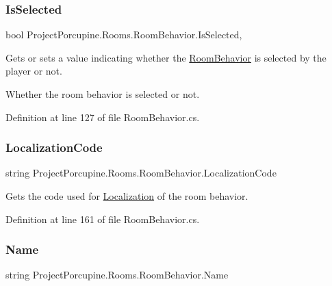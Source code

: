 \subsubsection{\texorpdfstring{Is\+Selected}{IsSelected}}
{\footnotesize\ttfamily bool Project\+Porcupine.\+Rooms.\+Room\+Behavior.\+Is\+Selected\hspace{0.3cm}{\ttfamily [get]}, {\ttfamily [set]}}



Gets or sets a value indicating whether the \hyperlink{class_project_porcupine_1_1_rooms_1_1_room_behavior}{Room\+Behavior} is selected by the player or not. 

Whether the room behavior is selected or not.

Definition at line 127 of file Room\+Behavior.\+cs.

\mbox{\label{class_project_porcupine_1_1_rooms_1_1_room_behavior_aa7bf0c23e20fde63d0ed6018c8a11884}} 
\subsubsection{\texorpdfstring{Localization\+Code}{LocalizationCode}}
{\footnotesize\ttfamily string Project\+Porcupine.\+Rooms.\+Room\+Behavior.\+Localization\+Code\hspace{0.3cm}{\ttfamily [get]}}



Gets the code used for \hyperlink{namespace_project_porcupine_1_1_localization}{Localization} of the room behavior. 



Definition at line 161 of file Room\+Behavior.\+cs.

\mbox{\label{class_project_porcupine_1_1_rooms_1_1_room_behavior_a283c9dd902ca5806b8f672f27ca6eb98}} 
\subsubsection{\texorpdfstring{Name}{Name}}
{\footnotesize\ttfamily string Project\+Porcupine.\+Rooms.\+Room\+Behavior.\+Name\hspace{0.3cm}{\ttfamily [get]}}



